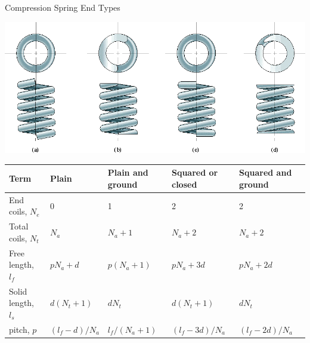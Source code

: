 \documentclass[10pt, svgnames]{beamer}
\begin{document}
\begin{frame}[label={sec:org8b8b1c6}]{Compression Spring End Types}
\begin{center}
\includegraphics[width=.9\linewidth]{./pictures/end-types.png}
\end{center}

\scriptsize
\begin{tabular}{lllll}
  \toprule
  Term                       & Plain              & Plain and ground & Squared or closed & Squared and ground \\
  \midrule
  End coils, $N_e$ & 0                  & 1                & 2                 & 2                  \\
  Total coils, $N_t$& $N_a$             & $N_a + 1$        & $N_a + 2$         & $N_a + 2$           \\
  Free length, $l_f$         & $p N_a + d$        & $p(N_a+1)$        & $pN_a+3d$         & $pN_a+2d$           \\
  Solid length, $l_s$        & $d(N_{t}+1)$       & $dN_t$           & $d(N_t+1)$         & $dN_t$             \\
  pitch, $p$                 & $(l_f-d)/N_a$      & $l_f/(N_a+1)$     & $(l_f-3d)/N_a$    & $(l_f-2d)/N_a$      \\
  \bottomrule
\end{tabular}
\end{frame}
\end{document}
